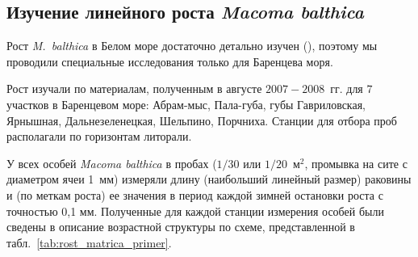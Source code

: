 \afterpage{\clearpage}

	\subsection{Изучение линейного роста {\it Macoma balthica}}
Рост \textit{M.~balthica} в Белом море достаточно детально изучен (\cite{Semenova_1970, Maximovich_et_al_1992, Hummel_et_al_1998}), поэтому мы проводили специальные исследования только для Баренцева моря.

Рост изучали по материалам, полученным в августе $2007 - 2008$~гг. для $7$ участков в Баренцевом море: Абрам-мыс, Пала-губа, губы Гавриловская, Ярнышная, Дальнезеленецкая, Шельпино, Порчниха.
Станции для отбора проб располагали по горизонтам литорали. 

У всех особей {\it Macoma balthica} в пробах ($1/30$ или $1/20$~м$^2$, промывка на сите с диаметром ячеи 1~мм) измеряли длину (наибольший линейный размер) раковины и (по меткам роста) ее значения в период каждой зимней остановки роста с точностью 0,1 мм.
Полученные для каждой станции измерения особей были сведены в описание возрастной структуры по схеме, представленной в табл.~\ref{tab:rost_matrica_primer}. 
